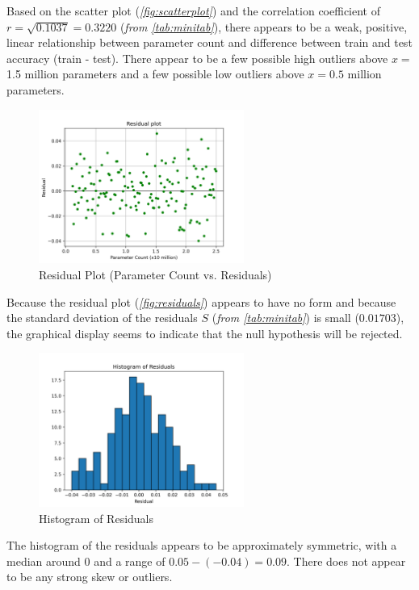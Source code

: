 \documentclass[12pt]{article}
\begin{document}
    \noindent
    Based on the scatter plot (\textit{\autoref{fig:scatterplot}}) and the correlation coefficient of $r=\sqrt{0.1037}=0.3220$ (\textit{from \autoref{tab:minitab}}), there appears to be a weak,
    positive, linear relationship between parameter count and difference between train and test accuracy (train - test).
    There appear to be a few possible high outliers above $x =$ 1.5 million parameters
    and a few possible low outliers above $x = 0.5$ million parameters.
    \begin{figure}[H]
        \centering
        \includegraphics[width=0.6\textwidth]{Images/Resid}
        \caption{Residual Plot (Parameter Count vs. Residuals)}
        \label{fig:residuals}
    \end{figure}
    \noindent Because the residual plot (\textit{\autoref{fig:residuals}}) appears to have no form and because the standard
    deviation of the residuals $S$ (\textit{from \autoref{tab:minitab}}) is small ($0.01703$), the graphical display seems to
    indicate that the null hypothesis will be rejected.
    \begin{figure}[H]
        \centering
        \includegraphics[width=0.6\textwidth]{Images/Resid Hist}
        \caption{Histogram of Residuals}
        \label{fig:residual_hist}
    \end{figure}
    \noindent The histogram of the residuals appears to be approximately symmetric, with a median around 0 and a range of
    $0.05-(-0.04)=0.09$. There does not appear to be any strong skew or outliers.
\end{document}
